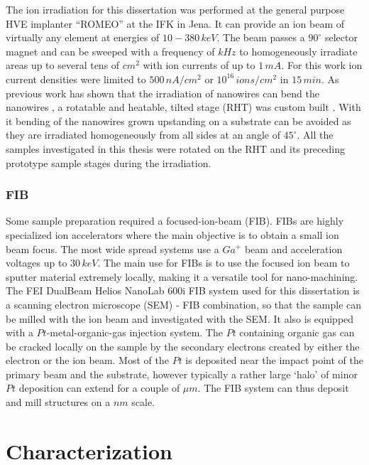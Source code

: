The ion irradiation for this dissertation was performed at the general purpose HVE implanter ``ROMEO'' at the IFK in Jena. It can provide an ion beam of virtually any element at energies of $10-380\,keV$. The beam passes a $90^\circ$ selector magnet and can be sweeped with a frequency of $kHz$ to homogeneously irradiate areas up to several tens of $cm^2$ with ion currents of up to $1\,mA$. For this work ion current densities were limited to $500\,nA/cm^2$ or $10^{16}\,ions/cm^2$ in $15\,min$. As previous work has shown that the irradiation of nanowires can bend the nanowires \cite{borschel_permanent_2011, borschel_ion-solid_2012}, a rotatable and heatable, tilted stage (RHT) was custom built \cite{noack_sputter_2014}. With it bending of the nanowires grown upstanding on a substrate can be avoided as they are irradiated homogeneously from all sides at an angle of $45^\circ$. All the samples investigated in this thesis were rotated on the RHT and its preceding prototype sample stages during the irradiation. 

\subsubsection{FIB}

Some sample preparation required a focused-ion-beam (FIB). FIBs are highly specialized ion accelerators where the main objective is to obtain a small ion beam focus. The most wide spread systems use a $Ga^+$ beam and acceleration voltages up to $30\,keV$. The main use for FIBs is to use the focused ion beam to sputter material extremely locally, making it a versatile tool for nano-machining. The FEI DualBeam Helios NanoLab 600i FIB system used for this dissertation is a scanning electron microscope (SEM) - FIB combination, so that the sample can be milled with the ion beam and investigated with the SEM. It also is equipped with a $Pt$-metal-organic-gas injection system. The $Pt$ containing organic gas can be cracked locally on the sample by the secondary electrons created by either the electron or the ion beam. Most of the $Pt$ is deposited near the impact point of the primary beam and the substrate, however typically a rather large `halo' of minor $Pt$ deposition can extend for a couple of $\mu m$. The FIB system can thus deposit and mill structures on a $nm$ scale. 

\section{Characterization}

